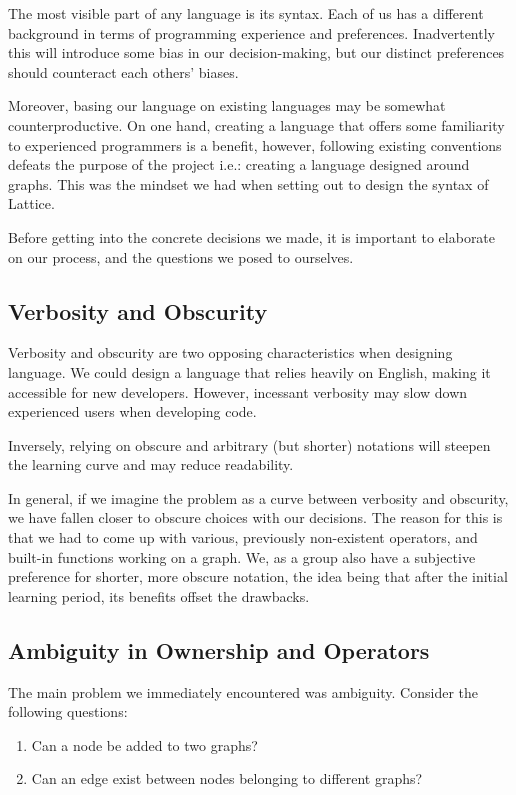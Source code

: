 The most visible part of any language is its syntax.
Each of us has a different background in terms of programming experience and preferences.
Inadvertently this will introduce some bias in our decision-making, but our distinct preferences
should counteract each others' biases.

Moreover, basing our language on existing languages may be somewhat counterproductive.
On one hand, creating a language that offers some familiarity to experienced programmers is a benefit,
however, following existing conventions defeats the purpose of the project i.e.: creating a language designed around graphs.
This was the mindset we had when setting out to design the syntax of Lattice.

Before getting into the concrete decisions we made, it is important to elaborate on our process, and the questions
we posed to ourselves.

\subsection{Verbosity and Obscurity}\label{subsec:syntax_verbostiy_and_obscurity}
Verbosity and obscurity are two opposing characteristics when designing language.
We could design a language that
relies heavily on English, making it accessible for new developers.
However, incessant verbosity may slow down experienced users when developing code.

Inversely, relying on obscure and arbitrary (but shorter) notations will
steepen the learning curve and may reduce readability.

In general, if we imagine the problem as a curve between verbosity and obscurity, we have fallen closer to
obscure choices with our decisions.
The reason for this is that we had to come up with various, previously
non-existent operators, and built-in functions working on a graph.
We, as a group also have a subjective preference for shorter, more obscure notation, the idea being that
after the initial learning period, its benefits offset the drawbacks.


\subsection{Ambiguity in Ownership and Operators}\label{subsec:syntax_ambigoutiy_in_ownership_and_operators}
The main problem we immediately encountered was ambiguity.
Consider the following questions:

\begin{enumerate}
    \item Can a node be added to two graphs?
    \item Can an edge exist between nodes belonging to different graphs?
\end{enumerate}

